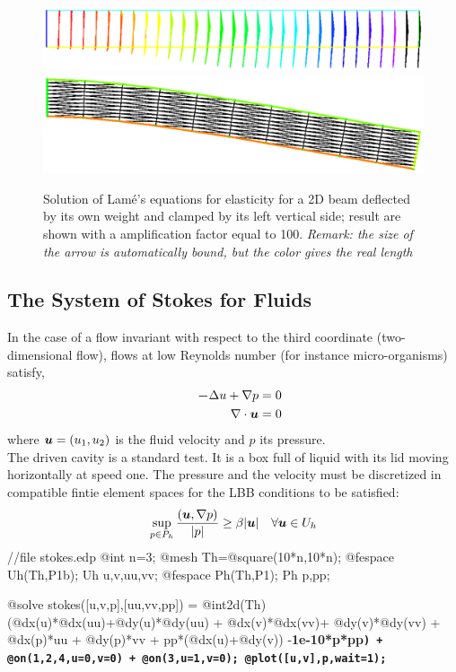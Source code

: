 \documentclass[a4paper,twoside,12pt]{book}
\def\vec#1{\mbox{\boldmath $#1$}}
\def\n{\nabla}
\begin{document}
\begin{figure}[hbtp]
\begin{center}
\includegraphics[width=15cm]{lamevect}\\
\includegraphics[width=15cm]{lamedeform}

\caption{\label{figlame} Solution of Lam\'e's equations for elasticity for a 2D beam deflected by its
own weight and clamped by its left vertical side; result are shown with a amplification factor equal to  100.
{\em Remark: the size of the arrow  is automatically bound, but the color gives the real length}}
\end{center}
\end{figure}

\subsection{The System of Stokes for Fluids}

In the case of a flow invariant with respect to the third coordinate
(two-dimensional flow), flows at low Reynolds number (for instance
micro-organisms) satisfy,
\begin{eqnarray*}&&
    \vec -\Delta u + \n p =0
    \cr&&
    \n\cdot \vec u =0
\end{eqnarray*}
where $\vec u=(u_1,u_2)$ is the fluid velocity and $p$ its pressure.
\\
The driven cavity is a standard test. It is a box full of liquid with its lid moving horizontally
at speed one.  The pressure and the velocity must be discretized in compatible fintie
element spaces for the LBB conditions to be satisfied:
\[
    \sup_{p\in P_h}\frac{(\vec u,\n p)}{|p|}\geq \beta|\vec u|~~~\forall \vec u\in U_h
\]
\bFF
//file stokes.edp
@int n=3;
@mesh Th=@square(10*n,10*n);
@fespace Uh(Th,P1b); Uh u,v,uu,vv;
@fespace Ph(Th,P1);  Ph p,pp;

@solve stokes([u,v,p],[uu,vv,pp]) =
    @int2d(Th)(@dx(u)*@dx(uu)+@dy(u)*@dy(uu) + @dx(v)*@dx(vv)+ @dy(v)*@dy(vv)
              + @dx(p)*uu + @dy(p)*vv + pp*(@dx(u)+@dy(v))
              -\bf 1e-10*p*pp\tt)
            + @on(1,2,4,u=0,v=0) + @on(3,u=1,v=0);
@plot([u,v],p,wait=1);
\eFF
\end{document}
